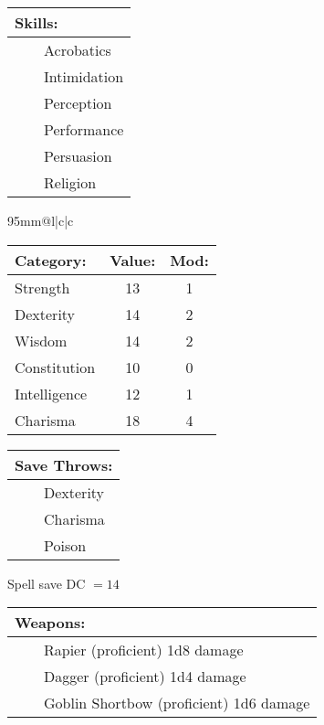 \documentclass[11pt]{article}
\newcommand{\tabitem}{~~\llap{--}~~}
\begin{document}
\begin{multicols}{2}
\vspace{2mm}

\noindent \begin{tabularx}{95mm}{@{}l}
{\Large \textbf{Skills:}} \\
\hline
\tabitem Acrobatics 	\\
\tabitem Intimidation	\\
\tabitem Perception		\\
\tabitem Performance	\\
\tabitem Persuasion		\\
\tabitem Religion
		\end{tabularx}

\vspace{2mm}

\noindent \begin{tabularx}{95mm}{@{}l|c|c}
 \\
\hline
		\end{tabularx}
\noindent \begin{tabular}{@{}l|c|c}
\textbf{Category:} 			& \textbf{Value:} 	& \textbf{Mod:} \\
\hline
Strength 					& 13 				& 1		\\
Dexterity 					& 14 				& 2		\\
Wisdom 						& 14				& 2		\\
Constitution 				& 10 				& 0		\\
Intelligence 				& 12 				& 1		\\
Charisma 					& 18 				& 4
		\end{tabular}

\vspace{2mm}

\noindent \begin{tabularx}{95mm}{@{}l}
{\Large \textbf{Save Throws:}} \\
\hline
\tabitem Dexterity \\
\tabitem Charisma \\
\tabitem Poison
		\end{tabularx}
\noindent Spell save DC $= 14$

\vspace{2mm}

\noindent \begin{tabularx}{95mm}{@{}l}
{\Large \textbf{Weapons:}} \\
\hline
\tabitem Rapier (proficient) 1d8 damage \\
\tabitem Dagger (proficient) 1d4 damage \\
\tabitem Goblin Shortbow (proficient) 1d6 damage
		\end{tabularx}


\end{multicols}
\end{document}
